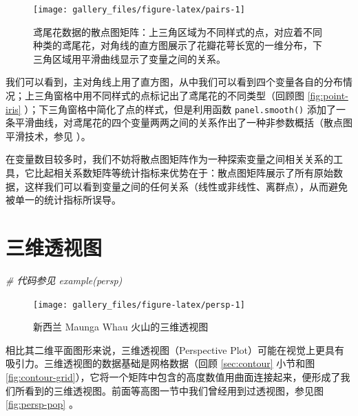 \documentclass[
  b5paper,
  UTF8,twoside]{book}
\newenvironment{Shaded}{\begin{snugshade}}{\end{snugshade}}
\newcommand{\CommentTok}[1]{\textcolor[rgb]{0.56,0.35,0.01}{\textit{#1}}}
\begin{document}
\begin{figure}

{\centering \texttt{[image: gallery\_files/figure-latex/pairs-1]} 

}

\caption[鸢尾花数据的散点图矩阵]{鸢尾花数据的散点图矩阵：上三角区域为不同样式的点，对应着不同种类的鸢尾花，对角线的直方图展示了花瓣花萼长宽的一维分布，下三角区域用平滑曲线显示了变量之间的关系。}\label{fig:pairs}
\end{figure}

我们可以看到，主对角线上用了直方图，从中我们可以看到四个变量各自的分布情况；上三角窗格中用不同样式的点标记出了鸢尾花的不同类型（回顾图 \ref{fig:point-iris}
）；下三角窗格中简化了点的样式，但是利用函数 \texttt{panel.smooth()} 添加了一条平滑曲线，对鸢尾花的四个变量两两之间的关系作出了一种非参数概括（散点图平滑技术，参见 \citet{Cleveland79}）。

在变量数目较多时，我们不妨将散点图矩阵作为一种探索变量之间相关关系的工具，它比起相关系数矩阵等统计指标来优势在于：散点图矩阵展示了所有原始数据，这样我们可以看到变量之间的任何关系（线性或非线性、离群点），从而避免被单一的统计指标所误导。

\hypertarget{sec:persp}{%
\section{三维透视图}\label{sec:persp}}

\begin{Shaded}
\begin{Highlighting}[]
\CommentTok{\# 代码参见 example(persp)}
\end{Highlighting}
\end{Shaded}





\begin{figure}

{\centering \texttt{[image: gallery\_files/figure-latex/persp-1]} 

}

\caption[新西兰 Maunga Whau 火山的三维透视图]{新西兰 Maunga Whau 火山的三维透视图}\label{fig:persp}
\end{figure}

相比其二维平面图形来说，三维透视图（Perspective Plot）可能在视觉上更具有吸引力。三维透视图的数据基础是网格数据（回顾 \ref{sec:contour} 小节和图 \ref{fig:contour-grid}），它将一个矩阵中包含的高度数值用曲面连接起来，便形成了我们所看到的三维透视图。前面等高图一节中我们曾经用到过透视图，参见图 \ref{fig:persp-pop}
。
\end{document}
